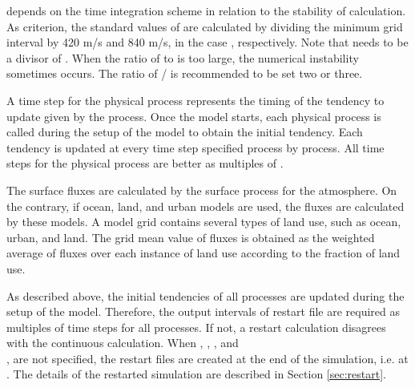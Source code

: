  depends on the time integration scheme in relation to the stability of calculation. As criterion, the standard values of  are calculated by dividing the minimum grid interval by 420 m/s and 840 m/s, in the case , respectively.
Note that  needs to be a divisor of .
When the ratio of  to  is too large,
the numerical instability sometimes occurs.
The ratio of / is recommended to be set two or three.


A time step for the physical process represents the timing of the tendency to update given by the process. Once the model starts, each physical process is called during the setup of the model to obtain the initial tendency. Each tendency is updated at every time step specified process by process. All time steps for the physical process are better as multiples of .

The surface fluxes are calculated by the surface process for the atmosphere. On the contrary, if ocean, land, and urban models are used, the fluxes are calculated by these models. A model grid contains several types of land use, such as ocean, urban, and land. The grid mean value of fluxes is obtained as the weighted average of fluxes over each instance of land use according to the fraction of land use.

As described above, the initial tendencies of all processes are updated during the setup of the model. Therefore, the output intervals of restart file are required as multiples of time steps for all processes. If not, a restart calculation disagrees with the continuous calculation. When , ,  , and\\ , are not specified, the restart files are created at the end of the simulation, i.e. at . The details of the restarted simulation are described in Section \ref{sec:restart}.
